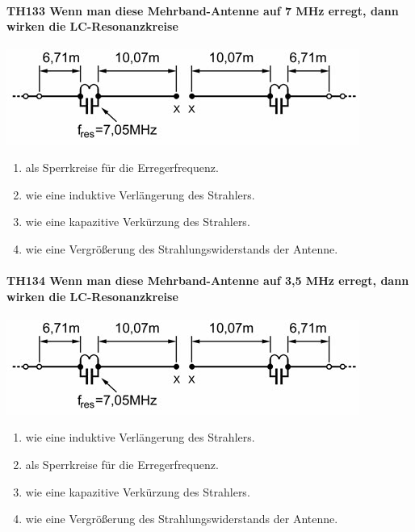 \documentclass[8pt]{article}
\begin{document}
\paragraph*{TH133 Wenn man diese Mehrband-Antenne auf 7 MHz erregt, dann wirken die LC-Resonanzkreise} 
\begin{center}
	\begin{minipage}{\linewidth}
		\centering
		\includegraphics[scale=1.0]{pics/th133_a.jpg}
	\end{minipage}
\end{center}
\begin{enumerate}[nolistsep,label=\Alph*]
\item als Sperrkreise für die Erregerfrequenz.
\item wie eine induktive Verlängerung des Strahlers.
\item wie eine kapazitive Verkürzung des Strahlers.
\item wie eine Vergrößerung des Strahlungswiderstands der Antenne.
\end{enumerate}

\paragraph*{TH134 Wenn man diese Mehrband-Antenne auf 3,5 MHz erregt, dann wirken die LC-Resonanzkreise}
\begin{center}
	\begin{minipage}{\linewidth}
		\centering
		\includegraphics[scale=1.0]{pics/th134_a.jpg}
	\end{minipage}
\end{center}
\begin{enumerate}[nolistsep,label=\Alph*]
\item wie eine induktive Verlängerung des Strahlers.
\item als Sperrkreise für die Erregerfrequenz.
\item wie eine kapazitive Verkürzung des Strahlers.
\item wie eine Vergrößerung des Strahlungswiderstands der Antenne.
\end{enumerate}
\end{document}
